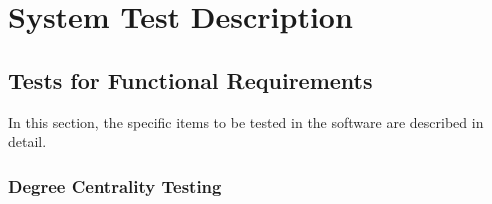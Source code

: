 \documentclass[12pt, titlepage]{article}
\begin{document}
\section{System Test Description}
	
\subsection{Tests for Functional Requirements}
In this section, the specific items to be tested in the software are described in detail.


		



					
					
					
					
					


\subsubsection{Degree Centrality Testing}
\end{document}
